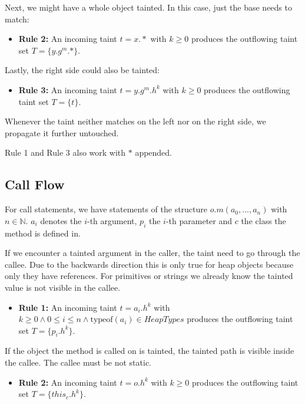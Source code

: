 \documentclass[../draft.tex]{subfiles}
\begin{document}
    Next, we might have a whole object tainted. In this case, just the base needs to match:
    \begin{itemize}
        \item[] \textbf{Rule 2:} An incoming taint $t = x.*$ with $k \geq 0$ produces the outflowing taint set $T = \{y.g^m.*\}$.
    \end{itemize} 

    Lastly, the right side could also be tainted:
    \begin{itemize}
        \item[] \textbf{Rule 3:} An incoming taint $t = y.g^m.h^k$ with $k \geq 0$ produces the outflowing taint set $T = \{t\}$.
    \end{itemize}


    Whenever the taint neither matches on the left nor on the right side, we propagate it further untouched.

    Rule 1 and Rule 3 also work with $*$ appended.

    \subsection{Call Flow}
    For call statements, we have statements of the structure $o.m(a_0, ..., a_n)$ with $n \in \mathbb{N}$. $a_i$ denotes the $i$-th argument, $p_i$ the $i$-th parameter and $c$ the class the method is defined in.

    If we encounter a tainted argument in the caller, the taint need to go through the callee. Due to the backwards direction this is only true for heap objects because only they have references. For primitives or strings we already know the tainted value is not visible in the callee.
    \begin{itemize}
        \item[] \textbf{Rule 1:} An incoming taint $t = a_i.h^k$ with $k \geq 0 \land 0 \leq i \leq n \land \text{typeof}(a_i) \in \mathit{HeapTypes}$ produces the outflowing taint set $T = \{p_i.h^k\}$.
    \end{itemize}

    If the object the method is called on is tainted, the tainted path is visible inside the callee. The callee must be not static.
    \begin{itemize}
        \item[] \textbf{Rule 2:} An incoming taint $t = o.h^k$ with $k \geq 0$ produces the outflowing taint set $T = \{\mathit{this}_c.h^k\}$. 
    \end{itemize}
    
\end{document}
